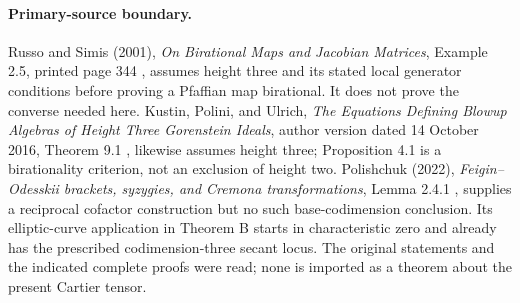\paragraph{Primary-source boundary.}
Russo and Simis (2001), \emph{On Birational Maps and Jacobian Matrices},
Example 2.5, printed page 344 \cite[Example 2.5]{RussoSimis2001Birational}, assumes height three and its stated
local generator conditions before proving a Pfaffian map birational.
It does not prove the converse needed here.
Kustin, Polini, and Ulrich, \emph{The Equations Defining Blowup Algebras
of Height Three Gorenstein Ideals}, author version dated 14 October
2016, Theorem 9.1 \cite[Proposition 4.1 and Theorem 9.1]{KustinPoliniUlrich2016Blowups}, likewise assumes height three; Proposition 4.1 is
a birationality criterion, not an exclusion of height two.
Polishchuk (2022), \emph{Feigin--Odesskii brackets, syzygies, and
Cremona transformations}, Lemma 2.4.1 \cite[Theorem B and Lemma 2.4.1]{Polishchuk2022Cremona}, supplies a reciprocal
cofactor construction but no such base-codimension conclusion.
Its elliptic-curve application in Theorem B starts in characteristic
zero and already has the prescribed codimension-three secant locus.
The original statements and the indicated complete proofs were read;
none is imported as a theorem about the present Cartier tensor.
